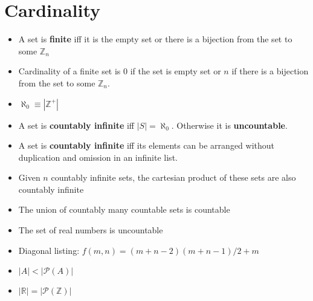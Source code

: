 \documentclass[11pt, twocolumn]{article}
\newenvironment{compactitem}
{\begin{itemize}
  \setlength{\itemsep}{1px}
  \setlength{\parskip}{0pt}
  \setlength{\parsep}{0pt}}
{\end{itemize}}
\begin{document}
\section{Cardinality}
\begin{compactitem}
\item A set is \textbf{finite} iff it is the empty set or there is a bijection from the set to some $\mathbb{Z}_n$
\item Cardinality of a finite set is 0 if the set is empty set or $n$ if there is a bijection from the set to some $\mathbb{Z}_n$.
\item $\aleph_0 \equiv |\mathbb{Z}^+|$
\item A set is \textbf{countably infinite} iff $|S| = \aleph_0$. Otherwise it is \textbf{uncountable}.
\item A set is \textbf{countably infinite} iff its elements can be arranged without duplication and omission in an infinite list.
\item Given $n$ countably infinite sets, the cartesian product of these sets are also countably infinite
\item The union of countably many countable sets is countable
\item The set of real numbers is uncountable
\item Diagonal listing: $f(m, n) = (m + n - 2)(m + n - 1) / 2 + m$
\item $|A|<|\mathcal{P}(A)|$
\item $|\mathbb{R}|=|\mathcal{P}(\mathbb{Z})|$
\end{compactitem}
\end{document}
